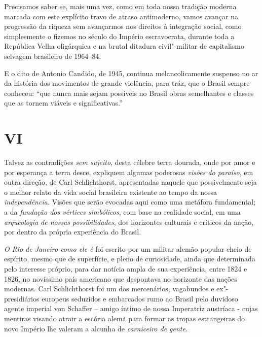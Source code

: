 Precisamos saber se, mais uma vez, como em toda nossa tradição moderna
marcada com este explícito travo de atraso antimoderno, vamos avançar na
progressão da riqueza sem avançarmos nos direitos à integração social,
como simplesmente o fizemos no século do Império escravocrata, durante
toda a República Velha oligárquica e na brutal ditadura civil"-militar de
capitalismo selvagem brasileiro de 1964--84.

E o dito de Antonio Candido, de 1945, continua melancolicamente suspenso
no ar da história dos movimentos de grande violência, para tráz, que o
Brasil sempre conheceu: ``que nunca mais sejam possíveis no Brasil obras
semelhantes e classes que as tornem viáveis e significativas.''\\

\section{VI}

Talvez as contradições \emph{sem sujeito}, desta célebre terra dourada,
onde por amor e por esperança a terra desce, expliquem algumas poderosas
\emph{visões do paraíso}, em outra direção, de Carl Schlichthorst,
apresentadas naquele que possivelmente seja o melhor relato da vida
social brasileira existente ao tempo da nossa \emph{independência}.
Visões que serão evocadas aqui como uma metáfora fundamental; a da
\emph{fundação dos vértices simbólicos}, com base na realidade social,
em uma \emph{arqueologia de nossas possibilidades}, dos horizontes
culturais e críticos da nação, por dentro da própria experiência do
Brasil.

\emph{O Rio de Janeiro como ele é} foi escrito por um militar alemão
popular cheio de espírito, mesmo que de superfície, e pleno de
curiosidade, ainda que determinada pelo interesse próprio, para dar
notícia ampla de sua experiência, entre 1824 e 1826, no novíssimo país
americano que despontava no horizonte das nações modernas. Carl
Schlichthorst foi um dos mercenários, vagabundos e ex"-presidiários
europeus seduzidos e embarcados rumo ao Brasil pelo duvidoso agente
imperial von Schaffer -- amigo íntimo de nossa Imperatriz austríaca -
cujas mentiras visando atrair a escória alemã para formar as tropas
estrangeiras do novo Império lhe valeram a alcunha de \emph{carniceiro
de gente.}


